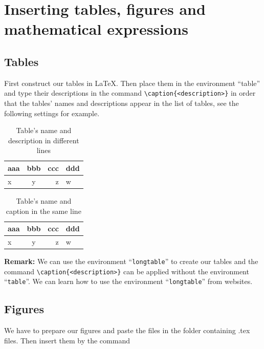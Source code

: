 






\section{Inserting tables, figures and mathematical expressions}

\subsection{Tables}

\subsectionindent First construct our tables in \LaTeX. Then place them in the environment “table” and type their descriptions in the command \verb|\caption{<description>}| in order that the tables’ names and descriptions appear in the list of tables, see the following settings for example.

\begin{table}[!h]
	\caption[Table’s name and description in different lines]{\newline Table’s name and description in different lines}
	\centering
	\begin{tabular}{|l|c|r|p{1cm}|}
		\hline
		aaa & bbb & ccc & ddd\\
		\hline
		x & y & z & w\\
		\hline
	\end{tabular}
\end{table}

\begin{table}[!h]
	\caption{Table’s name and caption in the same line}
	\centering
	\begin{tabular}{|l|c|r|p{1cm}|}
		\hline
		aaa & bbb & ccc & ddd\\
		\hline
		x & y & z & w\\
		\hline
	\end{tabular}
\end{table}

\noindent\textbf{Remark:} We can use the environment “\verb|longtable|” to create our tables and the command \verb|\caption{<description>}| can be applied without the environment “\verb|table|”. We can learn how to use the environment “\verb|longtable|” from websites.

\subsection{Figures}

\subsectionindent We have to prepare our figures and paste the files in the folder containing .tex files. Then insert them by the command

